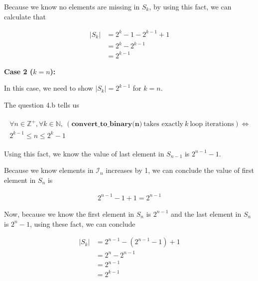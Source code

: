 \documentclass[12pt]{article}
\begin{document}
\begin{enumerate}[a.]
\begin{mdframed}
\begin{enumerate}[1.]
\begin{mdframed}
            \bigskip

            Because we know no elements are missing in $S_k$,
            by using this fact, we can calculate that

            \begin{align}
                \lvert S_k \rvert &= 2^k -1 - 2^{k-1} + 1\\
                &= 2^k - 2^{k-1}\\
                &= 2^{k-1}
            \end{align}

            \bigskip

            \textbf{Case 2 ($k = n$):}

            \bigskip

            In this case, we need to show $\lvert S_k \rvert = 2^{k-1}$
            for $k = n$.

            \bigskip

            The question 4.b tells us

            \begin{align}
                \begin{split}
                \forall n \in \mathbb{Z}^+, \forall k \in \mathbb{N},\: (\textbf{
                convert\_to\_binary(n)}\:\text{takes exactly}\:k\:\text{loop iterations}) \Leftrightarrow
                \\ 2^{k-1} \leq n \leq 2^k -1
                \end{split}
            \end{align}

            \bigskip

            Using this fact, we know the value of last element in $S_{n-1}$
            is $2^{n-1} - 1$.

            \bigskip

            Because we know elements in $\mathcal{I}_n$ increases by 1,
            we can conclude the value of first element in $S_n$ is

            \begin{align}
                2^{n-1} - 1 + 1 = 2^{n-1}
            \end{align}

            \bigskip

            Now, because we know the first element in $S_n$ is $2^{n-1}$
            and the last element in $S_n$ is $2^n -1$, using
            these fact, we can conclude

            \begin{align}
                \lvert S_k \rvert &= 2^{n-1} - (2^{n-1} - 1) + 1\\
                &= 2^n - 2^{n-1}\\
                &= 2^{n-1}\\
                &= 2^{k-1}
            \end{align}


\end{mdframed}
\end{enumerate}
\end{mdframed}
\end{enumerate}
\end{document}
